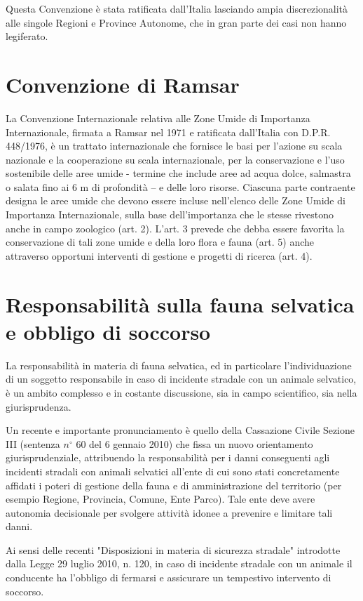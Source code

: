 \documentclass[11pt,a4paper,twoside]{memoir}
\begin{document}
Questa Convenzione è stata ratificata dall'Italia lasciando ampia discrezionalità alle singole Regioni e Province Autonome, che in gran parte dei casi non hanno legiferato.

\section{Convenzione di Ramsar}
\label{sec:norme_ramsar}
La Convenzione Internazionale relativa alle Zone Umide di Importanza Internazionale, firmata a Ramsar nel 1971 e ratificata dall’Italia con D.P.R. 448/1976, è un trattato internazionale che fornisce le basi per l’azione su scala nazionale e la cooperazione su scala internazionale, per la conservazione e l’uso sostenibile delle aree umide - termine che include aree ad acqua dolce, salmastra o salata fino ai 6 m di profondità – e delle loro risorse. Ciascuna parte contraente designa le aree umide che devono essere incluse nell’elenco delle Zone Umide di Importanza Internazionale, sulla base dell’importanza che le stesse rivestono anche in campo zoologico (art. 2). L’art. 3 prevede che debba essere favorita la conservazione di tali zone umide e della loro flora e fauna (art. 5) anche attraverso opportuni interventi di gestione e progetti di ricerca (art. 4).

\section{Responsabilità sulla fauna selvatica e obbligo di soccorso}
\label{sec:norme_responsabilita}
La responsabilità in materia di fauna selvatica, ed in particolare l'individuazione di un soggetto responsabile in caso di incidente stradale con un animale selvatico, è un ambito complesso e in costante discussione, sia in campo scientifico, sia nella giurisprudenza.

Un recente e importante pronunciamento è quello della Cassazione Civile Sezione III (sentenza $n^{\circ}$ 60 del 6 gennaio 2010) che fissa un nuovo orientamento giurisprudenziale, attribuendo la responsabilità per i danni conseguenti agli incidenti stradali con animali selvatici all'ente di cui sono stati concretamente affidati i poteri di gestione della fauna e di amministrazione del territorio (per esempio Regione, Provincia, Comune, Ente Parco). Tale ente deve avere autonomia decisionale per svolgere attività idonee a prevenire e limitare tali danni.

Ai sensi delle recenti "Disposizioni in materia di sicurezza stradale" introdotte dalla Legge 29 luglio 2010, n. 120, in caso di incidente stradale con un animale il conducente ha l'obbligo di fermarsi e assicurare un tempestivo intervento di soccorso.
\end{document}
